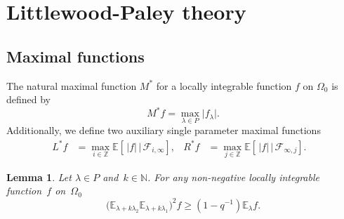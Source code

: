 \documentclass[a4paper]{amsart}
\newcommand{\abs}[1]{{\lvert {#1} \rvert}}
\newcommand{\EE}{\mathbb{E}}
\newcommand{\ZZ}{\mathbb{Z}}
\newcommand{\NN}{\mathbb{N}}
\theoremstyle{plain}
\newtheorem{lemma}[proposition]{Lemma}
\theoremstyle{definition}
\theoremstyle{remark}
\numberwithin{equation}{section}
\theoremstyle{plain}
\begin{document}
\section{Littlewood-Paley theory}
\subsection{Maximal functions}
The natural maximal function $M^*$ for a locally integrable function
$f$ on $\Omega_0$ is defined by
\begin{equation*}
M^* f = \max_{\lambda \in P} \abs{f_\lambda}.
\end{equation*}
Additionally, we define two auxiliary single parameter maximal functions
\begin{align*}
L^* f &= \max_{i \in \ZZ} \EE[\,|f|\, |\, \mathcal{F}_{i, \infty}], &
R^* f &= \max_{j \in \ZZ} \EE[\,|f|\, |\, \mathcal{F}_{\infty,j}]. &
\end{align*}
\begin{lemma}
\label{lem:2}
  Let $\lambda \in P$ and~$k \in \NN$. For any non-negative locally
  integrable function~$f$ on~$\Omega_0$
  \begin{equation*}
    \big(\EE_{\lambda+k \lambda_2} \EE_{\lambda+k\lambda_1}\big)^2 f
     \geq (1-q^{-1}) \EE_\lambda f.
  \end{equation*}
\end{lemma}
\end{document}
